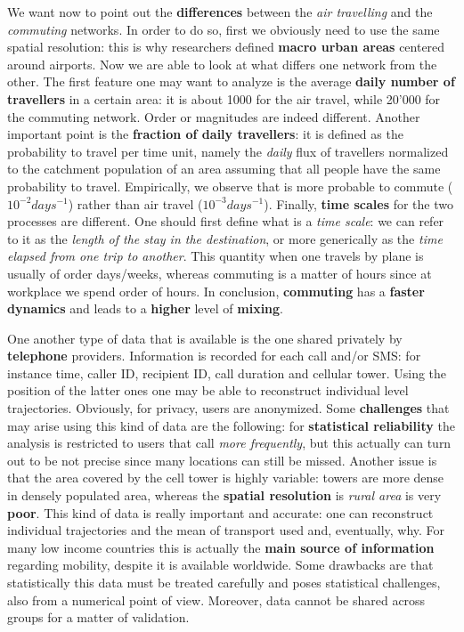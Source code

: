 \documentclass[../main/main.tex]{subfiles}
\begin{document}
We want now to point out the \textbf{differences} between the \textit{air travelling} and the \textit{commuting} networks. In order to do so, first we obviously need to use the same spatial resolution: this is why researchers defined \textbf{macro urban areas} centered around airports. Now we are able to look at what differs one network from the other. The first feature one may want to analyze is the average \textbf{daily number of travellers} in a certain area: it is about 1000 for the air travel, while 20'000 for the commuting network. Order or magnitudes are indeed different. Another important point is the \textbf{fraction of daily travellers}: it is defined as the probability to travel per time unit, namely the \textit{daily} flux of travellers normalized to the catchment population of an area assuming that all people have the same probability to travel. Empirically, we observe that is more probable to commute ($10^{-2} days^{-1}$) rather than air travel ($10^{-3} days^{-1}$). Finally, \textbf{time scales} for the two processes are different. One should first define what is a \textit{time scale}: we can refer to it as the \textit{length of the stay in the destination}, or more generically as the \textit{time elapsed from one trip to another}. This quantity when one travels by plane is usually of order days/weeks, whereas commuting is a matter of hours since at workplace we spend order of hours. In conclusion, \textbf{commuting} has a \textbf{faster dynamics} and leads to a \textbf{higher} level of \textbf{mixing}.

One another type of data that is available is the one shared privately by \textbf{telephone} providers. Information is recorded for each call and/or SMS: for instance time, caller ID, recipient ID, call duration and cellular tower. Using the position of the latter ones one may be able to reconstruct individual level trajectories. Obviously, for privacy, users are anonymized. Some \textbf{challenges} that may arise using this kind of data are the following: for \textbf{statistical reliability} the analysis is restricted to users that call \textit{more frequently}, but this actually can turn out to be not precise since many locations can still be missed. Another issue is that the area covered by the cell tower is highly variable: towers are more dense in densely populated area, whereas the \textbf{spatial resolution} is \textit{rural area} is very \textbf{poor}. This kind of data is really important and accurate: one can reconstruct individual trajectories and the mean of transport used and, eventually, why. For many low income countries this is actually the \textbf{main source of information} regarding mobility, despite it is available worldwide. Some drawbacks are that statistically this data must be treated carefully and poses statistical challenges, also from a numerical point of view. Moreover, data cannot be shared across groups for a matter of validation.
\end{document}

